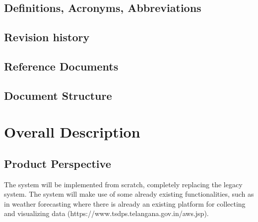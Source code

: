 \documentclass[10pt]{article}
\begin{document}
\subsection{Definitions, Acronyms, Abbreviations}
\subsection{Revision history}
\subsection{Reference Documents}
\subsection{Document Structure}
\newpage
\section{Overall Description}
\subsection{Product Perspective}
The system will be implemented from scratch, completely replacing the legacy system.
The system will make use of some already existing functionalities, such as in weather forecasting where there is 
already an existing platform for collecting and visualizing data (https://www.tsdps.telangana.gov.in/aws.jsp).
\end{document}
